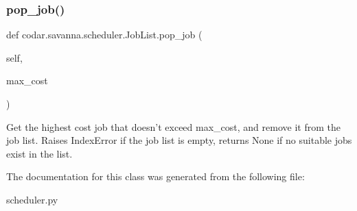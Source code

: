 \subsubsection{\texorpdfstring{pop\+\_\+job()}{pop\_job()}}
{\footnotesize\ttfamily def codar.\+savanna.\+scheduler.\+Job\+List.\+pop\+\_\+job (\begin{DoxyParamCaption}\item[{}]{self,  }\item[{}]{max\+\_\+cost }\end{DoxyParamCaption})}

\begin{DoxyVerb}Get the highest cost job that doesn't exceed max_cost, and remove
it from the job list. Raises IndexError if the job list is empty,
returns None if no suitable jobs exist in the list.\end{DoxyVerb}
 

The documentation for this class was generated from the following file\+:\begin{DoxyCompactItemize}
\item 
scheduler.\+py\end{DoxyCompactItemize}
